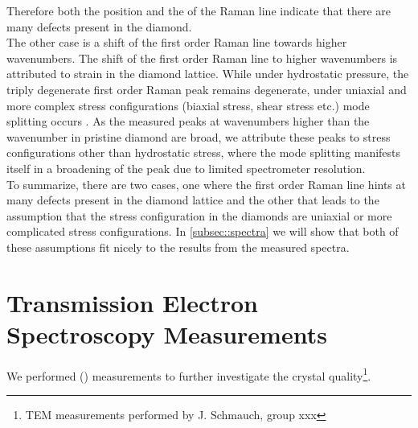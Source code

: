 		Therefore both the position and the \lw of the Raman line indicate that there are many defects present in the diamond.
		\\
		The other case is a shift of the first order Raman line towards higher wavenumbers.
		The shift of the first order Raman line to higher wavenumbers is attributed to strain in the diamond lattice.
		While under hydrostatic pressure, the triply degenerate first order Raman peak remains degenerate, under uniaxial and more complex stress configurations (biaxial stress, shear stress etc.) mode splitting occurs \cite{Prawer2004}.
		As the measured peaks at wavenumbers higher than the wavenumber in pristine diamond are broad, we attribute these peaks to stress configurations other than hydrostatic stress, where the mode splitting manifests itself in a broadening of the peak due to limited spectrometer resolution.
		\\
		To summarize, there are two cases, one where the first order Raman line hints at many defects present in the diamond lattice and the other that leads to the assumption that the stress configuration in the diamonds are uniaxial or more complicated stress configurations.
		In \autoref{subsec::spectra} we will show that both of these assumptions fit nicely to the results from the measured \pl spectra. 

	\section[TEM]{Transmission Electron Spectroscopy Measurements}{\label{sec::tem}}

		We performed \tem (\TEM) measurements to further investigate the crystal quality\footnote{TEM measurements performed by J. Schmauch, group xxx}.

